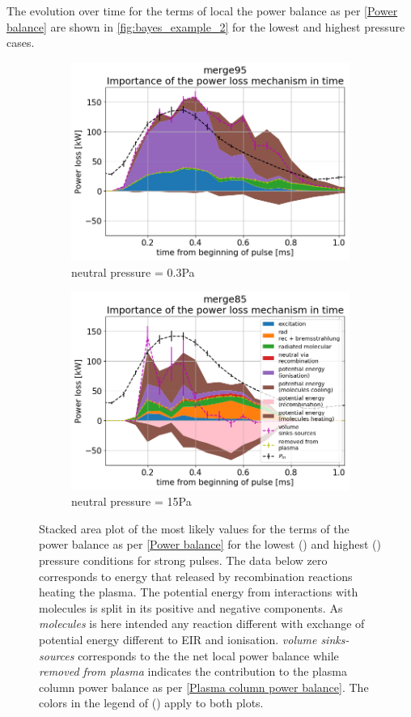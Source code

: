 The evolution over time for the terms of local the power balance as per \autoref{Power balance} are shown in \autoref{fig:bayes_example_2} for the lowest and highest pressure cases.
\begin{figure}[!ht]
	\centering
     \begin{subfigure}{1\linewidth}
        \centering
    	\includegraphics[width=0.7\linewidth,trim={5 0 5 45},clip]{Chapters/chapter3/figs/_merge95_global_fit_example44.png}
         \caption{neutral pressure = 0.3Pa}
        \label{fig:bayes_example_2a}
    \end{subfigure}
    \hfill
    \begin{subfigure}{1\linewidth}
        \centering
        \includegraphics[width=0.7\linewidth,trim={5 0 5 45},clip]{Chapters/chapter3/figs/_merge85_global_fit_example7.png}
         \caption{neutral pressure = 15Pa}
        \label{fig:bayes_example_2b}
    \end{subfigure}
	\caption{Stacked area plot of the most likely values for the terms of the power balance as per \autoref{Power balance} for the lowest () and highest () pressure conditions for strong pulses. The data below zero corresponds to energy that released by recombination reactions heating the plasma. The potential energy from interactions with molecules is split in its positive and negative components. As \emph{molecules} is here intended any reaction different with exchange of potential energy different to EIR and ionisation. \emph{volume sinks-sources} corresponds to the the net local power balance while \emph{removed from plasma} indicates the contribution to the plasma column power balance as per \autoref{Plasma column power balance}. The colors in the legend of () apply to both plots.}
    \label{fig:bayes_example_2}
\end{figure}
